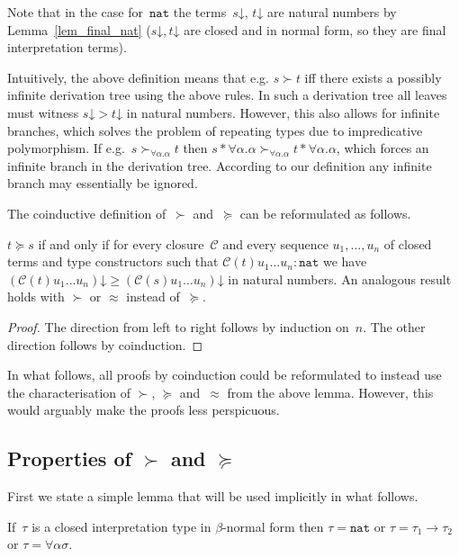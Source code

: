 \documentclass[runningheads,a4paper]{llncs}
\newcommand{\cl}{\mathcal{C}}
\newcommand{\arrtype}{\rightarrow}
\newcommand{\tapp}[2]{#1 * #2}
\newcommand{\nat}{\mathtt{nat}}
\newcommand{\da}{\mathord{\downarrow}}
\begin{document}
Note that in the case for~$\nat$ the terms~$s\da$, $t\da$ are natural
numbers by Lemma~\ref{lem_final_nat} ($s\da,t\da$ are closed and in
normal form, so they are final interpretation terms).

Intuitively, the above definition means that e.g. $s \succ t$ iff
there exists a possibly infinite derivation tree using the above
rules. In such a derivation tree all leaves must witness $s\da > t\da$
in natural numbers. However, this also allows for infinite branches,
which solves the problem of repeating types due to impredicative
polymorphism. If e.g.~$s \succ_{\forall \alpha . \alpha} t$ then
$\tapp{s}{\forall\alpha.\alpha} \succ_{\forall \alpha . \alpha}
\tapp{t}{\forall\alpha.\alpha}$, which forces an infinite branch in
the derivation tree. According to our definition any infinite branch
may essentially be ignored.

The coinductive definition of~$\succ$ and~$\succeq$ can be
reformulated as follows.

\begin{lemma}
  $t \succeq s$ if and only if for every closure~$\cl$ and every
  sequence $u_1,\ldots,u_n$ of closed terms and type constructors such
  that $\cl(t) u_1 \ldots u_n : \nat$ we have $(\cl(t) u_1 \ldots
  u_n)\da \ge (\cl(s) u_1 \ldots u_n)\da$ in natural numbers. An
  analogous result holds with $\succ$ or $\approx$ instead
  of~$\succeq$.
\end{lemma}

\begin{proof}
  The direction from left to right follows by induction on~$n$. The
  other direction follows by coinduction.
\end{proof}

In what follows, all proofs by coinduction could be reformulated to
instead use the characterisation of $\succ$, $\succeq$ and~$\approx$
from the above lemma. However, this would arguably make the proofs
less perspicuous.

\subsection{Properties of $\succ$ and $\succeq$}

First we state a simple lemma that will be used implicitly in what
follows.

\begin{lemma}
  If~$\tau$ is a closed interpretation type in $\beta$-normal form
  then $\tau = \nat$ or $\tau = \tau_1\arrtype\tau_2$ or $\tau =
  \forall\alpha\sigma$.
\end{lemma}
\end{document}
